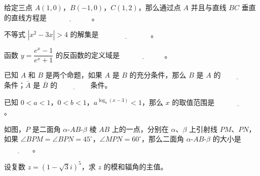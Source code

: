 \begin{question}

给定三点 $A(1,0)$，$B(-1,0)$，$C(1,2)$，那么通过点 $A$ 并且与直线 $BC$ 垂直的直线方程是 $\underline{\hspace{6em}}$。

\end{question}
\begin{question}

不等式 $|x^2-3x|>4$ 的解集是 $\underline{\hspace{7em}}$。

\end{question}
\begin{question}

函数 $y=\dfrac{e^x-1}{e^x+1}$ 的反函数的定义域是 $\underline{\hspace{6em}}$。

\end{question}
\begin{question}

已知 $A$ 和 $B$ 是两个命题，如果 $A$ 是 $B$ 的充分条件，那么 $B$ 是 $A$ 的 $\underline{\hspace{4em}}$ 条件；$\overline A$ 是 $\overline B$ 的 $\underline{\hspace{4em}}$ 条件。

\end{question}
\begin{question}

已知 $0<a<1$，$0<b<1$，$a^{\log_b(x-3)}<1$，那么 $x$ 的取值范围是 $\underline{\hspace{6em}}$。

\Needspace{0.4\textheight}
\end{question}
\begin{question}

如图，$P$ 是二面角 $\alpha$-$AB$-$\beta$ 棱 $AB$ 上的一点，分别在 $\alpha$、$\beta$ 上引射线 $PM$、$PN$，如果 $\angle BPM=\angle BPN=45^\circ$，$\angle MPN=60^\circ$，那么二面角 $\alpha$-$AB$-$\beta$ 的大小是 $\underline{\hspace{4em}}$。
\nopagebreak[4]
\begin{center}\end{center}
\nopagebreak[4]
\end{question}
\begin{question}

设复数 $z=(1-\sqrt3 i)^5$，求 $z$ 的模和辐角的主值。

\end{question}
